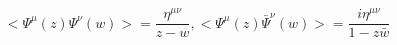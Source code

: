 \begin{equation}
<\Psi^\mu(z)\Psi^\nu(w)>=\frac{\eta^{\mu\nu}}{z-w},
<\Psi^\mu(z){\bar\Psi}^\nu(w)>=\frac{i\eta^{\mu\nu}}{1-z\bar w}
\end{equation}

